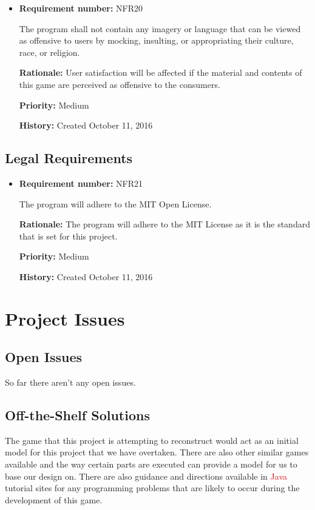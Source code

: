 \documentclass[12pt,letterpaper]{article}
\begin{document}
\begin{reqbox}
	\begin{itemize}
	\item \textbf{Requirement number: }NFR20

	The program shall not contain any imagery or language that can be viewed as offensive to users by mocking, insulting, or appropriating their culture, race, or religion.

	\textbf{Rationale: }User satisfaction will be affected if the material and contents of this game are perceived as offensive to the consumers.

	\textbf{Priority: }Medium

	\textbf{History: }Created October 11, 2016
	\end{itemize}
\end{reqbox}

\subsection{Legal Requirements}

\begin{reqbox}
	\begin{itemize}

	\item \textbf{Requirement number: }NFR21   
	
	The program will adhere to the MIT Open License.

	\textbf{Rationale: }The program will adhere to the MIT License as it is the standard that is set for this project.
	
	\textbf{Priority: }Medium   
	
	\textbf{History: }Created October 11, 2016   
	\end{itemize}
\end{reqbox}


\section{Project Issues}
\subsection{Open Issues}
So far there aren’t any open issues.
\subsection{Off-the-Shelf Solutions}
The game that this project is attempting to reconstruct would act as an initial model for this project that we have overtaken. There are also other similar games available and the way certain parts are executed can provide a model for us to base our design on. There are also guidance and directions available in \textcolor{red}{Java} tutorial sites for any programming problems that are likely to occur during the development of this game.  
\end{document}
